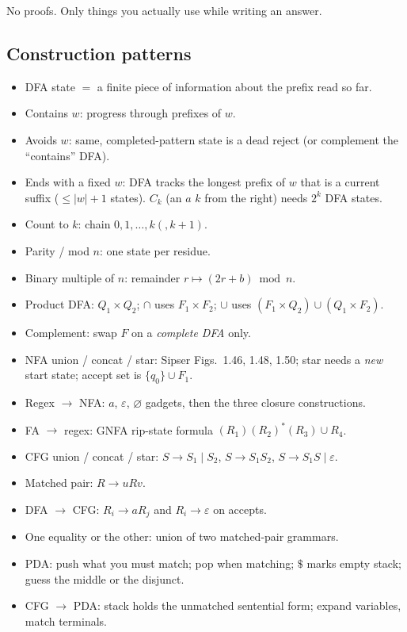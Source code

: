 \documentclass[11pt,a4paper]{article}
\newcommand{\eps}{\varepsilon}
\begin{document}
No proofs. Only things you actually use while writing an answer.

\subsection{Construction patterns}

\begin{itemize}[leftmargin=1.2em]
  \item DFA state $=$ a finite piece of information about the
        prefix read so far.
  \item Contains $w$: progress through prefixes of $w$.
  \item Avoids $w$: same, completed-pattern state is a dead
        reject (or complement the ``contains'' DFA).
  \item Ends with a fixed $w$: DFA tracks the longest prefix of
        $w$ that is a current suffix ($\le|w|+1$ states). $C_k$
        (an $a$ $k$ from the right) needs $2^k$ DFA states.
  \item Count to $k$: chain $0,1,\dots,k(,k{+}1)$.
  \item Parity / mod $n$: one state per residue.
  \item Binary multiple of $n$: remainder $r\mapsto(2r+b)\bmod n$.
  \item Product DFA: $Q_1\times Q_2$; $\cap$ uses $F_1\times F_2$;
        $\cup$ uses $(F_1\times Q_2)\cup(Q_1\times F_2)$.
  \item Complement: swap $F$ on a \emph{complete DFA} only.
  \item NFA union / concat / star: Sipser Figs.~1.46, 1.48, 1.50;
        star needs a \emph{new} start state; accept set is
        $\{q_0\}\cup F_1$.
  \item Regex $\to$ NFA: $a$, $\eps$, $\varnothing$ gadgets, then
        the three closure constructions.
  \item FA $\to$ regex: GNFA rip-state formula
        $(R_1)(R_2)^*(R_3)\cup R_4$.
  \item CFG union / concat / star: $S\to S_1\mid S_2$,
        $S\to S_1S_2$, $S\to S_1S\mid\eps$.
  \item Matched pair: $R\to uRv$.
  \item DFA $\to$ CFG: $R_i\to aR_j$ and $R_i\to\eps$ on accepts.
  \item One equality or the other: union of two matched-pair
        grammars.
  \item PDA: push what you must match; pop when matching; $\$$
        marks empty stack; guess the middle or the disjunct.
  \item CFG $\to$ PDA: stack holds the unmatched sentential form;
        expand variables, match terminals.
\end{itemize}
\end{document}
